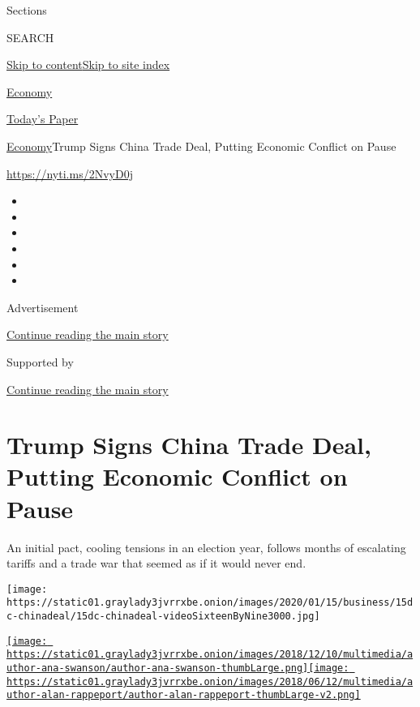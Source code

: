 Sections

SEARCH

\protect\hyperlink{site-content}{Skip to
content}\protect\hyperlink{site-index}{Skip to site index}

\href{https://www.nytimes3xbfgragh.onion/section/business/economy}{Economy}

\href{https://myaccount.nytimes3xbfgragh.onion/auth/login?response_type=cookie\&client_id=vi}{}

\href{https://www.nytimes3xbfgragh.onion/section/todayspaper}{Today's
Paper}

\href{/section/business/economy}{Economy}\textbar{}Trump Signs China
Trade Deal, Putting Economic Conflict on Pause

\url{https://nyti.ms/2NvyD0j}

\begin{itemize}
\item
\item
\item
\item
\item
\item
\end{itemize}

Advertisement

\protect\hyperlink{after-top}{Continue reading the main story}

Supported by

\protect\hyperlink{after-sponsor}{Continue reading the main story}

\hypertarget{trump-signs-china-trade-deal-putting-economic-conflict-on-pause}{%
\section{Trump Signs China Trade Deal, Putting Economic Conflict on
Pause}\label{trump-signs-china-trade-deal-putting-economic-conflict-on-pause}}

An initial pact, cooling tensions in an election year, follows months of
escalating tariffs and a trade war that seemed as if it would never end.

\texttt{[image: https://static01.graylady3jvrrxbe.onion/images/2020/01/15/business/15dc-chinadeal/15dc-chinadeal-videoSixteenByNine3000.jpg]}

\href{https://www.nytimes3xbfgragh.onion/by/ana-swanson}{\texttt{[image: https://static01.graylady3jvrrxbe.onion/images/2018/12/10/multimedia/author-ana-swanson/author-ana-swanson-thumbLarge.png]}}\href{https://www.nytimes3xbfgragh.onion/by/alan-rappeport}{\texttt{[image: https://static01.graylady3jvrrxbe.onion/images/2018/06/12/multimedia/author-alan-rappeport/author-alan-rappeport-thumbLarge-v2.png]}}

